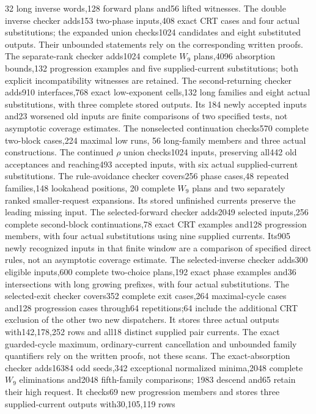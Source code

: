 \documentclass[11pt]{article}
\begin{document}
32 long inverse words,128 forward plans and56 lifted witnesses. The double
inverse checker adds153 two-phase inputs,408 exact CRT cases and four actual
substitutions; the expanded union checks1024 candidates and eight substituted
outputs. Their unbounded statements rely on the corresponding written proofs.
The separate-rank checker adds1024 complete $W_9$ plans,4096 absorption
bounds,132 progression examples and five supplied-current substitutions;
both explicit incompatibility witnesses are retained. The second-returning
checker adds910 interfaces,768 exact low-exponent cells,132 long families
and eight actual substitutions, with three complete stored outputs. Its
184 newly accepted inputs and23 worsened old inputs are finite comparisons
of two specified tests, not asymptotic coverage estimates. The nonselected
continuation checks570 complete two-block cases,224 maximal low runs,
56 long-family members and three actual constructions. The
continued $\rho$ union checks1024 inputs, preserving all442 old acceptances
and reaching493 accepted inputs, with six actual supplied-current
substitutions. The rule-avoidance
checker covers256 phase cases,48 repeated families,148 lookahead positions,
20 complete $W_9$ plans and two separately ranked smaller-request expansions.
Its stored unfinished currents preserve the leading missing input.
The selected-forward checker adds2049 selected inputs,256 complete
second-block continuations,78 exact CRT examples and128 progression
members, with four actual substitutions using nine supplied currents.
Its905 newly recognized inputs in that finite window are a comparison of
specified direct rules, not an asymptotic coverage estimate.
The selected-inverse checker adds300 eligible inputs,600 complete
two-choice plans,192 exact phase examples and36 intersections with long
growing prefixes, with four actual substitutions. The selected-exit
checker covers352 complete exit cases,264 maximal-cycle cases and128
progression cases through64 repetitions;64 include the additional CRT
exclusion of the other two new dispatchers. It stores three actual
outputs with142,178,252 rows and all18 distinct supplied pair currents.
The exact guarded-cycle maximum, ordinary-current cancellation and
unbounded family quantifiers rely on the written proofs, not these scans.
The exact-absorption checker adds16384 odd seeds,342 exceptional normalized
minima,2048 complete $W_9$ eliminations and2048 fifth-family comparisons;
1983 descend and65 retain their high request. It checks69 new progression
members and stores three supplied-current outputs with30,105,119 rows
\end{document}
